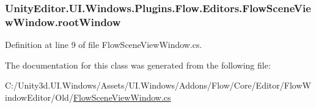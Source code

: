 \subsubsection[{root\+Window}]{ Unity\+Editor.\+U\+I.\+Windows.\+Plugins.\+Flow.\+Editors.\+Flow\+Scene\+View\+Window.\+root\+Window}\label{class_unity_editor_1_1_u_i_1_1_windows_1_1_plugins_1_1_flow_1_1_editors_1_1_flow_scene_view_window_ae81f98252dbe22df7cae144bdff82d0b}


Definition at line 9 of file Flow\+Scene\+View\+Window.\+cs.



The documentation for this class was generated from the following file\+:\begin{DoxyCompactItemize}
\item 
C\+:/\+Unity3d.\+U\+I.\+Windows/\+Assets/\+U\+I.\+Windows/\+Addons/\+Flow/\+Core/\+Editor/\+Flow\+Window\+Editor/\+Old/\hyperlink{_flow_scene_view_window_8cs}{Flow\+Scene\+View\+Window.\+cs}\end{DoxyCompactItemize}
